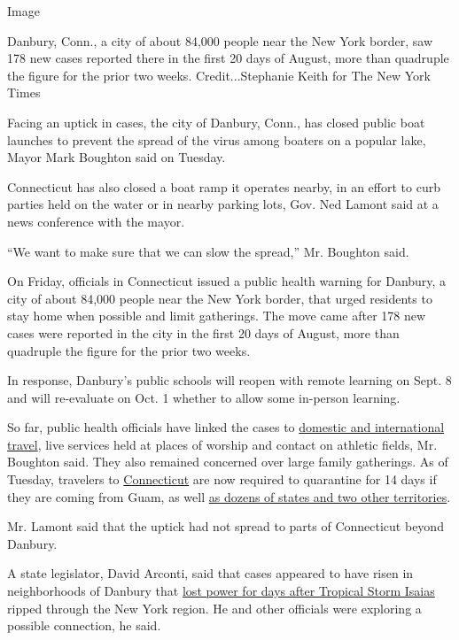 Image

Danbury, Conn., a city of about 84,000 people near the New York border,
saw 178 new cases reported there in the first 20 days of August, more
than quadruple the figure for the prior two weeks. Credit...Stephanie
Keith for The New York Times

Facing an uptick in cases, the city of Danbury, Conn., has closed public
boat launches to prevent the spread of the virus among boaters on a
popular lake, Mayor Mark Boughton said on Tuesday.

Connecticut has also closed a boat ramp it operates nearby, in an effort
to curb parties held on the water or in nearby parking lots, Gov. Ned
Lamont said at a news conference with the mayor.

``We want to make sure that we can slow the spread,'' Mr. Boughton said.

On Friday, officials in Connecticut issued a public health warning for
Danbury, a city of about 84,000 people near the New York border, that
urged residents to stay home when possible and limit gatherings. The
move came after 178 new cases were reported in the city in the first 20
days of August, more than quadruple the figure for the prior two weeks.

In response, Danbury's public schools will reopen with remote learning
on Sept. 8 and will re-evaluate on Oct. 1 whether to allow some
in-person learning.

So far, public health officials have linked the cases to
\href{https://portal.ct.gov/Coronavirus/Travel}{domestic and
international travel}, live services held at places of worship and
contact on athletic fields, Mr. Boughton said. They also remained
concerned over large family gatherings. As of Tuesday, travelers to
\href{https://twitter.com/GovNedLamont/status/1298290383408041986}{Connecticut}
are now required to quarantine for 14 days if they are coming from Guam,
as well \href{https://portal.ct.gov/Coronavirus/Travel}{as dozens of
states and two other territories}.

Mr. Lamont said that the uptick had not spread to parts of Connecticut
beyond Danbury.

A state legislator, David Arconti, said that cases appeared to have
risen in neighborhoods of Danbury that
\href{https://www.nytimes3xbfgragh.onion/2020/08/06/nyregion/isaias-storm-power-outages.html}{lost
power for days after Tropical Storm Isaias} ripped through the New York
region. He and other officials were exploring a possible connection, he
said.

